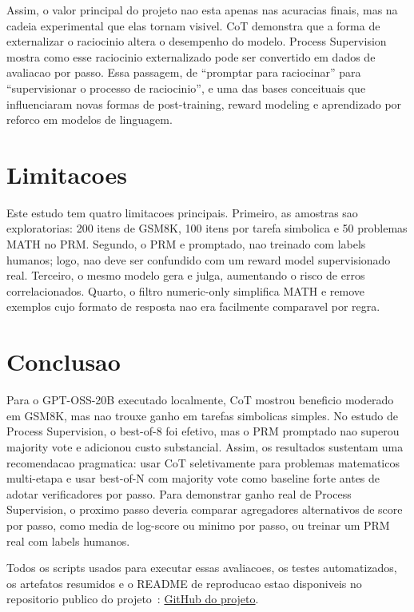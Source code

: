 \documentclass[a4paper,12pt]{article}
\begin{document}
Assim, o valor principal do projeto nao esta apenas nas acuracias finais, mas
na cadeia experimental que elas tornam visivel. CoT demonstra que a forma de
externalizar o raciocinio altera o desempenho do modelo. Process Supervision
mostra como esse raciocinio externalizado pode ser convertido em dados de
avaliacao por passo. Essa passagem, de ``promptar para raciocinar'' para
``supervisionar o processo de raciocinio'', e uma das bases conceituais que
influenciaram novas formas de post-training, reward modeling e aprendizado por
reforco em modelos de linguagem.

\section{Limitacoes}

Este estudo tem quatro limitacoes principais. Primeiro, as amostras sao
exploratorias: 200 itens de GSM8K, 100 itens por tarefa simbolica e 50 problemas
MATH no PRM. Segundo, o PRM e promptado, nao treinado com labels humanos; logo,
nao deve ser confundido com um reward model supervisionado real. Terceiro, o
mesmo modelo gera e julga, aumentando o risco de erros correlacionados. Quarto,
o filtro numeric-only simplifica MATH e remove exemplos cujo formato de resposta
nao era facilmente comparavel por regra.

\section{Conclusao}

Para o GPT-OSS-20B executado localmente, CoT mostrou beneficio moderado em
GSM8K, mas nao trouxe ganho em tarefas simbolicas simples. No estudo de Process
Supervision, o best-of-8 foi efetivo, mas o PRM promptado nao superou majority
vote e adicionou custo substancial. Assim, os resultados sustentam uma
recomendacao pragmatica: usar CoT seletivamente para problemas matematicos
multi-etapa e usar best-of-N com majority vote como baseline forte antes de
adotar verificadores por passo. Para demonstrar ganho real de Process
Supervision, o proximo passo deveria comparar agregadores alternativos de score
por passo, como media de log-score ou minimo por passo, ou treinar um PRM real
com labels humanos.

Todos os scripts usados para executar essas avaliacoes, os testes automatizados,
os artefatos resumidos e o README de reproducao estao disponiveis no repositorio
publico do projeto~\cite{repo}:
\href{https://github.com/costadev00/gpt-oss-eval-chain-of-thought}{GitHub do
projeto}.
\end{document}
